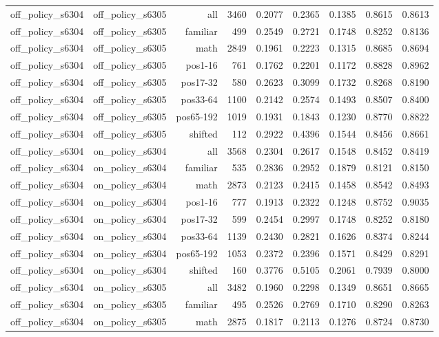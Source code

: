 \begin{tabular}{lrrrrrrrr}
off\_policy\_s6304 & off\_policy\_s6305 & all & 3460 & 0.2077 & 0.2365 & 0.1385 & 0.8615 & 0.8613 \\
off\_policy\_s6304 & off\_policy\_s6305 & familiar & 499 & 0.2549 & 0.2721 & 0.1748 & 0.8252 & 0.8136 \\
off\_policy\_s6304 & off\_policy\_s6305 & math & 2849 & 0.1961 & 0.2223 & 0.1315 & 0.8685 & 0.8694 \\
off\_policy\_s6304 & off\_policy\_s6305 & pos1-16 & 761 & 0.1762 & 0.2201 & 0.1172 & 0.8828 & 0.8962 \\
off\_policy\_s6304 & off\_policy\_s6305 & pos17-32 & 580 & 0.2623 & 0.3099 & 0.1732 & 0.8268 & 0.8190 \\
off\_policy\_s6304 & off\_policy\_s6305 & pos33-64 & 1100 & 0.2142 & 0.2574 & 0.1493 & 0.8507 & 0.8400 \\
off\_policy\_s6304 & off\_policy\_s6305 & pos65-192 & 1019 & 0.1931 & 0.1843 & 0.1230 & 0.8770 & 0.8822 \\
off\_policy\_s6304 & off\_policy\_s6305 & shifted & 112 & 0.2922 & 0.4396 & 0.1544 & 0.8456 & 0.8661 \\
off\_policy\_s6304 & on\_policy\_s6304 & all & 3568 & 0.2304 & 0.2617 & 0.1548 & 0.8452 & 0.8419 \\
off\_policy\_s6304 & on\_policy\_s6304 & familiar & 535 & 0.2836 & 0.2952 & 0.1879 & 0.8121 & 0.8150 \\
off\_policy\_s6304 & on\_policy\_s6304 & math & 2873 & 0.2123 & 0.2415 & 0.1458 & 0.8542 & 0.8493 \\
off\_policy\_s6304 & on\_policy\_s6304 & pos1-16 & 777 & 0.1913 & 0.2322 & 0.1248 & 0.8752 & 0.9035 \\
off\_policy\_s6304 & on\_policy\_s6304 & pos17-32 & 599 & 0.2454 & 0.2997 & 0.1748 & 0.8252 & 0.8180 \\
off\_policy\_s6304 & on\_policy\_s6304 & pos33-64 & 1139 & 0.2430 & 0.2821 & 0.1626 & 0.8374 & 0.8244 \\
off\_policy\_s6304 & on\_policy\_s6304 & pos65-192 & 1053 & 0.2372 & 0.2396 & 0.1571 & 0.8429 & 0.8291 \\
off\_policy\_s6304 & on\_policy\_s6304 & shifted & 160 & 0.3776 & 0.5105 & 0.2061 & 0.7939 & 0.8000 \\
off\_policy\_s6304 & on\_policy\_s6305 & all & 3482 & 0.1960 & 0.2298 & 0.1349 & 0.8651 & 0.8665 \\
off\_policy\_s6304 & on\_policy\_s6305 & familiar & 495 & 0.2526 & 0.2769 & 0.1710 & 0.8290 & 0.8263 \\
off\_policy\_s6304 & on\_policy\_s6305 & math & 2875 & 0.1817 & 0.2113 & 0.1276 & 0.8724 & 0.8730 \\

\end{tabular}

